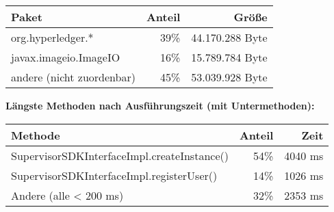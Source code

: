 \documentclass[parskip=full]{scrartcl}
\begin{document}
\begin{table}[h!]
	\begin{tabular}[t]{l r r}
		Paket & Anteil & Größe \\ \hline
		org.hyperledger.* & 39\% & 44.170.288 Byte \\
		javax.imageio.ImageIO & 16\% & 15.789.784 Byte \\
		andere (nicht zuordenbar) & 45\% & 53.039.928 Byte \\
	\end{tabular}
\end{table}
\textbf{Längste Methoden nach Ausführungszeit (mit Untermethoden):}

\begin{table}[h!]
	\begin{tabular}[t]{lrr}
		Methode & Anteil & Zeit \\ \hline
		SupervisorSDKInterfaceImpl.createInstance() & 54\% & 4040 ms \\
		SupervisorSDKInterfaceImpl.registerUser() & 14\% & 1026 ms \\
		Andere (alle < 200 ms) & 32\% & 2353 ms
	\end{tabular}
\end{table}
%
%
\end{document}
